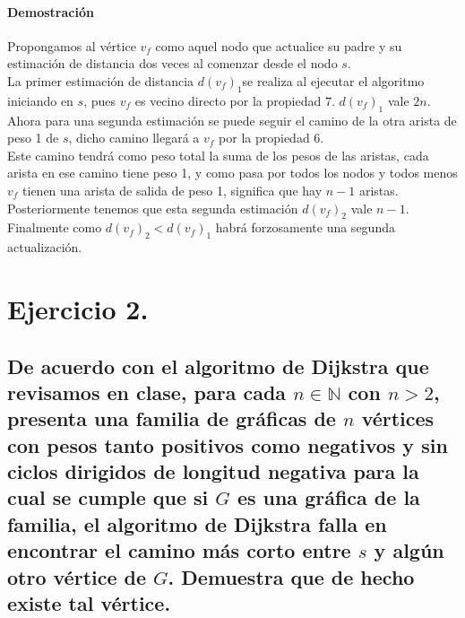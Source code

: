 \documentclass[12pt]{article}
\begin{document}
	\paragraph{Demostración} Propongamos al vértice $v_f$ como aquel nodo que actualice su padre y su estimación de distancia dos veces al comenzar desde el nodo $s$.\\
	La primer estimación de distancia $d(v_f)_1$se realiza al ejecutar el algoritmo iniciando en $s$, pues $v_f$ es vecino directo por la propiedad $7$. $d(v_f)_1$ vale $2n$. Ahora para una segunda estimación se puede seguir el camino de la otra arista de peso 1 de  $s$, dicho camino llegará a $v_f$ por  la propiedad $6$. \\ Este camino tendrá como peso total la suma de los pesos de las aristas, cada arista en ese camino tiene peso 1, y como pasa por todos los nodos y todos menos $v_f$ tienen una arista de salida de peso 1, significa que hay $n-1$ aristas. Posteriormente tenemos que esta segunda estimación $d(v_f)_2$ vale $n-1$. Finalmente como $d(v_f)_2  < d(v_f)_1$ habrá forzosamente una segunda actualización.
	\section{Ejercicio 2.}
	\subsection{De acuerdo con el algoritmo de Dijkstra que revisamos en clase, para cada $n\in \mathbb{N}$ con $n>2$, presenta una familia de gráficas de $n$ vértices con pesos tanto positivos como negativos y sin ciclos dirigidos de longitud negativa para la cual se cumple que si $G$ es una gráfica de la familia, el algoritmo de Dijkstra falla en encontrar el camino más corto entre $s$ y algún otro vértice de $G$. Demuestra que de hecho existe tal vértice.}
\end{document}
